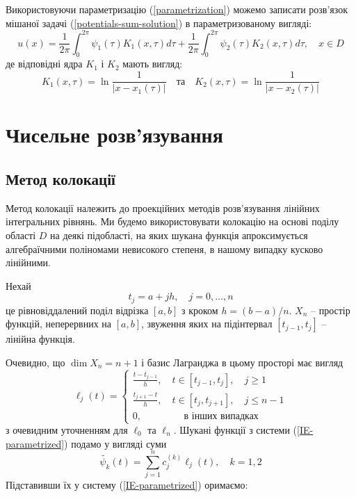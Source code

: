 \documentclass[14pt,a4paper]{extarticle}
\newcounter{e}
\numberwithin{equation}{section}
\numberwithin{figure}{section}
\begin{document}
 Використовуючи параметризацію (\ref{parametrization}) можемо записати розв'язок мішаної задачі (\ref{potentials-sum-solution}) в параметризованому вигляді:
 $$
 u(x)=\frac{1}{2 \pi} \int_{0}^{2 \pi} \psi_{1}(\tau) K_{1}(x, \tau) d \tau+\frac{1}{2 \pi} \int_{0}^{2 \pi} \psi_{2}(\tau) K_{2}(x, \tau) d \tau, \quad x \in D
 $$
 де відповідні ядра $K_{1}$ і $K_{2}$ мають вигляд:
 $$
  	K_{1}(x, \tau)=\ln \frac{1}{\left|x-x_{1}(\tau)\right|}
  	\quad \text{та} \quad 
 	K_{2}(x, \tau)=\ln \frac{1}{\left|x-x_{2}(\tau)\right|}
 $$
 
 
 
 
 \newpage
 \thispagestyle{empty}
 \section{Чисельне розв'язування}
 
 \subsection{Метод колокації}
 Метод колокації належить до проекційних методів розв'язування лінійних інтегральних рівнянь. Ми будемо використовувати колокацію на основі поділу області $D$ на деякі підобласті, на яких шукана функція апроксимується алгебраїчними поліномами невисокого степеня, в нашому випадку кусково лінійними.
 
 Нехай
 \begin{equation}
 	\label{tabulation}
 	t_{j}=a+j h, \quad j=0, \ldots, n
 \end{equation} 
 це рівновіддалений поділ відрізка $[a, b]$ з кроком $h=(b-a) / n$. $X_{n} $ -- простір функцій, неперервних на $[a, b]$, звуження яких на підінтервал $[t_{j-1}, t_{j}]$ -- лінійна функція.
 
 Очевидно, що $\dim X_n = n+1$ і базис Лагранджа в цьому просторі має вигляд
 \begin{equation}
	 \label{basis}
	 \ell_{j}(t)=\left\{
	 \begin{array}{lc}
	 	\displaystyle
	 	\frac{t-t_{j-1}}{h}, \quad t \in\left[t_{j-1}, t_{j}\right], \quad j \geq 1 \\
	 	\displaystyle
	 	\frac{t_{j+1}-t}{h}, \quad t \in\left[t_{j}, t_{j+1}\right], \quad j \leq n-1 \\
	 	0, \qquad\qquad \text { в інших випадках }
	 \end{array}\right.
 \end{equation}
 з очевидним уточненням для $\ell_0$ та $\ell_n$.
 Шукані функції з системи (\ref{IE-parametrized}) подамо у вигляді суми
 \begin{equation}
 	\tilde{\psi_k}(t)=\sum_{j=1}^{n} c^{(k)}_{j} \ell_{j}(t), \quad k = 1,2
 \end{equation}
 Підставивши їх у систему (\ref{IE-parametrized}) оримаємо:
 
\end{document}
